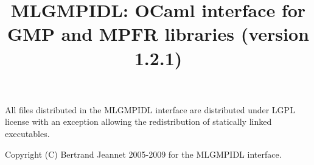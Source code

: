 \documentclass[[twoside,10pt,a4paper]{report}
\title{MLGMPIDL: OCaml interface for GMP and MPFR libraries (version 1.2.1)}
\begin{document}
\maketitle

\vspace*{0.9\textheight}

All files distributed in the MLGMPIDL interface are
distributed under LGPL license with an exception allowing 
the redistribution of statically linked executables.

Copyright (C) Bertrand Jeannet 2005-2009 for the MLGMPIDL
interface.

\newpage

\tableofcontents



\appendix
\printindex
\end{document}
